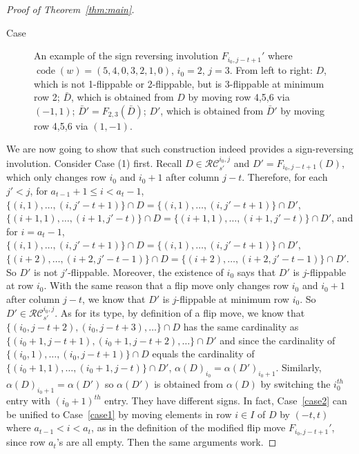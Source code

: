 \documentclass[ALCO,ThmDefs,Unicode,epreuves]{cedram}
\newcommand{\RC}{\mathcal{RC}}
\DeclareMathOperator{\code}{code}
\begin{document}
\begin{proof}[Proof of Theorem~\ref{thm:main}]
\begin{enonce}[remark]{Case}
\begin{figure}[h!]
\caption{An example of the sign reversing involution $F_{i_0,j-t+1}'$ where $\code(w)=(5,4,0,3,2,1,0)$, $i_0=2$, $j=3$. From left to right: $D$, which is not 1-flippable or 2-flippable, but is 3-flippable at minimum row 2; $\bar D$, which is obtained from $D$ by moving row 4,5,6 via $(-1,1)$; $\bar D'=F_{2,3}(\bar D)$; $D'$, which is obtained from $\bar D'$ by moving row 4,5,6 via $(1,-1)$.}
\label{fig:flipmodi}
\end{figure}
\end{enonce}
\let\thecdrthm\oldthecdrthm
\setcounter{cdrthm}{2}

We are now going to show that such construction indeed provides a sign-reversing involution. Consider Case (1) first. Recall $D\in\RC_{s'}^{i_0,j}$ and $D'=F_{i_0,j-t+1}(D)$, which only changes row $i_0$ and $i_0+1$ after column $j-t$. Therefore, for each $j'<j$, for $a_{t-1}+1\leq i<a_t-1$, $\{(i,1),\ldots,(i,j'-t+1)\}\cap D=\{(i,1),\ldots,(i,j'-t+1)\}\cap D'$, $\{(i+1,1),\ldots,(i+1,j'-t)\}\cap D=\{(i+1,1),\ldots,(i+1,j'-t)\}\cap D'$, and for $i=a_t-1$, $\{(i,1),\ldots,(i,j'-t+1)\}\cap D=\{(i,1),\ldots,(i,j'-t+1)\}\cap D'$, $\{(i+2),\ldots,(i+2,j'-t-1)\}\cap D=\{(i+2),\ldots,(i+2,j'-t-1)\}\cap D'$. So $D'$ is not $j'$-flippable. Moreover, the existence of $i_0$ says that $D'$ is $j$-flippable at row $i_0$. With the same reason that a flip move only changes row $i_0$ and $i_0+1$ after column $j-t$, we know that $D'$ is $j$-flippable at minimum row $i_0$. So $D'\in\RC_{s'}^{i_0,j}$. As for its type, by definition of a flip move, we know that $\{(i_0,j-t+2),(i_0,j-t+3),\ldots\}\cap D$ has the same cardinality as $\{(i_0+1,j-t+1),(i_0+1,j-t+2),\ldots\}\cap D'$ and since the cardinality of $\{(i_0,1),\ldots,(i_0,j-t+1)\}\cap D$ equals the cardinality of $\{(i_0+1,1),\ldots,(i_0+1,j-t)\}\cap D'$, $\alpha(D)_{i_0}=\alpha(D')_{i_0+1}$. Similarly, $\alpha(D)_{i_0+1}=\alpha(D')$ so $\alpha(D')$ is obtained from $\alpha(D)$ by switching the $i_0^{th}$ entry with $(i_0+1)^{th}$ entry. They have different signs. In fact, Case~\ref{case2} can be unified to Case~\ref{case1} by moving elements in row $i\in I$ of $D$ by $(-t,t)$ where $a_{t-1}<i<a_t$, as in the definition of the modified flip move $F_{i_0,j-t+1}'$, since row $a_t$'s are all empty. Then the same arguments work.


\end{proof}
\end{document}
